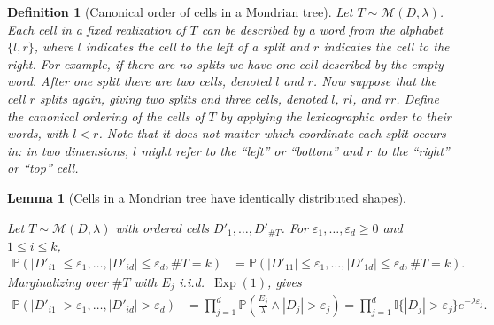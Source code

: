 \documentclass[11pt,lof]{puthesis}
\renewcommand{\P}{\ensuremath{\mathbb{P}}}
\newcommand{\I}{\ensuremath{\mathbb{I}}}
\newcommand{\cM}{\ensuremath{\mathcal{M}}}
\DeclareMathOperator{\Exp}{Exp}
\theoremstyle{break}
\newtheorem{lemma}{Lemma}[section]
\newtheorem{definition}{Definition}[section]
\theoremstyle{proof}
\begin{document}
\begin{definition}[Canonical order of cells in a Mondrian tree]
  Let $T \sim \cM(D, \lambda)$.
  Each cell in a fixed realization of $T$ can be described by
  a word from the alphabet $\{l, r\}$,
  where $l$ indicates the cell to the left of a split
  and $r$ indicates the cell to the right.
  For example, if there are no splits we have one cell
  described by the empty word.
  After one split there are two cells, denoted
  $l$ and $r$.
  Now suppose that the cell $r$ splits again, giving two splits and three cells,
  denoted $l$, $r l$, and $r r$.
  Define the canonical ordering of the cells of $T$ by applying
  the lexicographic order to their words, with $l < r$.
  Note that it does not matter which coordinate each split occurs in:
  in two dimensions, $l$ might refer to the ``left'' or ``bottom''
  and $r$ to the ``right'' or ``top'' cell.
\end{definition}

\begin{lemma}[Cells in a Mondrian tree have identically distributed shapes]
  \label{lem:mondrian_app_cells_identically_distributed}

  Let $T \sim \cM(D, \lambda)$
  with ordered cells $D'_1, \ldots, D'_{\# T}$.
  For $\varepsilon_1, \ldots, \varepsilon_d \geq 0$
  and $1 \leq i \leq k$,
  \begin{align*}
    \P\left(
      |D'_{i1}| \leq \varepsilon_1,
      \ldots, |D'_{id}| \leq \varepsilon_d,
      \# T = k
    \right)
    &=
    \P\left(
      |D'_{11}| \leq \varepsilon_1,
      \ldots, |D'_{1d}| \leq \varepsilon_d,
      \# T = k
    \right).
  \end{align*}
  Marginalizing over $\# T$
  with $E_j$ i.i.d.\ $\Exp(1)$,
  \citet[Proposition~1]{mourtada2020minimax} gives
  \begin{align*}
    \P\left(
      |D'_{i1}| > \varepsilon_1,
      \ldots, |D'_{id}| > \varepsilon_d
    \right)
    &=
    \prod_{j=1}^d
    \P\left(
      \frac{E_j}{\lambda} \wedge |D_j|
      > \varepsilon_j
    \right)
    = \prod_{j=1}^d
    \I\{|D_j| > \varepsilon_j\}
    e^{-\lambda \varepsilon_j}.
  \end{align*}

\end{lemma}
\end{document}
